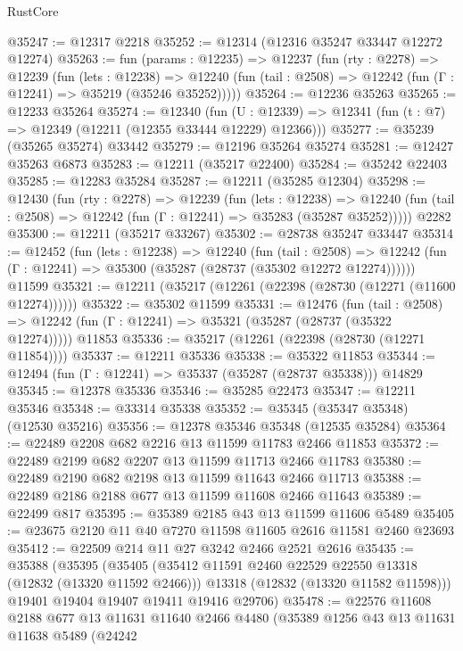 \begin{lexlean}{RustCore}
\begin{coremodule}
@35247 := @12317 @2218
@35252 := @12314 (@12316 @35247 @33447 @12272 @12274)
@35263 := fun (params : @12235) =>
  @12237
    (fun (rty : @2278) =>
    @12239
      (fun (lets : @12238) =>
      @12240 (fun (tail : @2508) => @12242 (fun (Γ : @12241) => @35219 (@35246 @35252)))))
@35264 := @12236 @35263
@35265 := @12233 @35264
@35274 := @12340
    (fun (U : @12339) => @12341 (fun (t : @7) => @12349 (@12211 (@12355 @33444 @12229) @12366)))
@35277 := @35239 (@35265 @35274) @33442
@35279 := @12196 @35264 @35274
@35281 := @12427 @35263 @6873
@35283 := @12211 (@35217 @22400)
@35284 := @35242 @22403
@35285 := @12283 @35284
@35287 := @12211 (@35285 @12304)
@35298 := @12430
    (fun (rty : @2278) =>
    @12239
      (fun (lets : @12238) =>
      @12240 (fun (tail : @2508) => @12242 (fun (Γ : @12241) => @35283 (@35287 @35252)))))
    @2282
@35300 := @12211 (@35217 @33267)
@35302 := @28738 @35247 @33447
@35314 := @12452
    (fun (lets : @12238) =>
    @12240
      (fun (tail : @2508) =>
      @12242 (fun (Γ : @12241) => @35300 (@35287 (@28737 (@35302 @12272 @12274))))))
    @11599
@35321 := @12211 (@35217 (@12261 (@22398 (@28730 (@12271 (@11600 @12274))))))
@35322 := @35302 @11599
@35331 := @12476
    (fun (tail : @2508) => @12242 (fun (Γ : @12241) => @35321 (@35287 (@28737 (@35322 @12274)))))
    @11853
@35336 := @35217 (@12261 (@22398 (@28730 (@12271 @11854))))
@35337 := @12211 @35336
@35338 := @35322 @11853
@35344 := @12494 (fun (Γ : @12241) => @35337 (@35287 (@28737 @35338))) @14829
@35345 := @12378 @35336
@35346 := @35285 @22473
@35347 := @12211 @35346
@35348 := @33314 @35338
@35352 := @35345 (@35347 @35348) (@12530 @35216)
@35356 := @12378 @35346 @35348 (@12535 @35284)
@35364 := @22489 @2208 @682 @2216 @13 @11599 @11783 @2466 @11853
@35372 := @22489 @2199 @682 @2207 @13 @11599 @11713 @2466 @11783
@35380 := @22489 @2190 @682 @2198 @13 @11599 @11643 @2466 @11713
@35388 := @22489 @2186 @2188 @677 @13 @11599 @11608 @2466 @11643
@35389 := @22499 @817
@35395 := @35389 @2185 @43 @13 @11599 @11606 @5489
@35405 := @23675 @2120 @11 @40 @7270 @11598 @11605 @2616 @11581 @2460 @23693
@35412 := @22509 @214 @11 @27 @3242 @2466 @2521 @2616
@35435 := @35388
    (@35395
      (@35405
        (@35412 @11591 @2460 @22529 @22550 @13318 (@12832 (@13320 @11592 @2466)))
        @13318
        (@12832 (@13320 @11582 @11598)))
      @19401
      @19404
      @19407
      @19411
      @19416
      @29706)
@35478 := @22576
    @11608
    @2188
    @677
    @13
    @11631
    @11640
    @2466
    @4480
    (@35389
      @1256
      @43
      @13
      @11631
      @11638
      @5489
      (@24242

\end{coremodule}
\end{lexlean}
